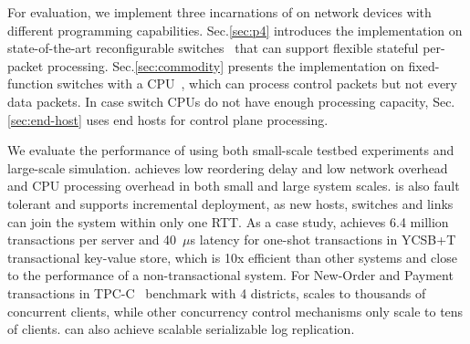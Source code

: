 For evaluation, we implement three incarnations of \sys on network devices with different programming capabilities.
Sec.\ref{sec:p4} introduces the implementation on state-of-the-art reconfigurable switches~\cite{tofino,cavium} that can support flexible stateful per-packet processing.
Sec.\ref{sec:commodity} presents the implementation on fixed-function switches with a CPU~\cite{arista}, which can process control packets but not every data packets.
In case switch CPUs do not have enough processing capacity, Sec.\ref{sec:end-host} uses end hosts for control plane processing.



We evaluate the performance of \sys using both small-scale testbed experiments and large-scale simulation.
\sys achieves low reordering delay and low network overhead and CPU processing overhead in both small and large system scales.
\sys is also fault tolerant and supports incremental deployment, as new hosts, switches and links can join the system within only one RTT.
As a case study, \sys achieves 6.4 million transactions per server and 40~$\mu$s latency for one-shot transactions in YCSB+T~\cite{dey2014ycsbt} transactional key-value store, which is 10x efficient than other systems and close to the performance of a non-transactional system.
For New-Order and Payment transactions in TPC-C~\cite{tpcc} benchmark with 4 districts, \sys scales to thousands of concurrent clients, while other concurrency control mechanisms only scale to tens of clients.
\sys can also achieve scalable serializable log replication.

